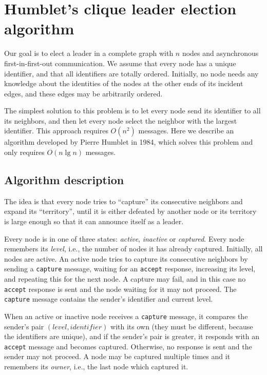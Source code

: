 \documentclass[a4paper,12pt]{article}
\newcommand{\tcapture}{\texttt{capture}\xspace}
\newcommand{\taccept}{\texttt{accept}\xspace}
\newcommand{\midentifier}{\mathit{identifier}}
\newcommand{\mlevel}{\mathit{level}}
\begin{document}
\section*{Humblet's clique leader election algorithm}

Our goal is to elect a leader in a complete graph with $n$ nodes and asynchronous first-in-first-out communication.
We assume that every node has a unique identifier, and that all identifiers are totally ordered.
Initially, no node needs any knowledge about the identities of the nodes at the other ends of its incident edges,
and these edges may be arbitrarily ordered.

The simplest solution to this problem is to let every node send its identifier to all its neighbors,
and then let every node select the neighbor with the largest identifier.
This approach requires $O(n^2)$ messages.
Here we describe an algorithm developed by Pierre Humblet in 1984,
which solves this problem and only requires $O(n \lg n)$ messages.

\subsection*{Algorithm description}

The idea is that every node tries to ``capture'' its consecutive neighbors and expand its ``territory'',
until it is either defeated by another node or its territory is large enough so that it can announce itself as a leader.

Every node is in one of three states: \emph{active}, \emph{inactive} or \emph{captured}.
Every node remembers its \emph{level}, i.e., the number of nodes it has already captured.
Initially, all nodes are active.
An active node tries to capture its consecutive neighbors
by sending a \tcapture message, waiting for an \taccept response, increasing its level, and repeating this for the next node.
A capture may fail, and in this case no \taccept response is sent and the node waiting for it may not proceed.
The \tcapture message contains the sender's identifier and current level.

When an active or inactive node receives a \tcapture message,
it compares the sender's pair $(\mlevel, \midentifier)$ with its own
(they must be different, because the identifiers are unique),
and if the sender's pair is greater, it responds with an \taccept message and becomes captured.
Otherwise, no response is sent and the sender may not proceed.
A node may be captured multiple times and it remembers its \emph{owner}, i.e., the last node which captured it.
\end{document}
